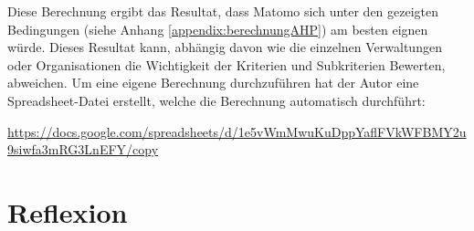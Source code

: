         Diese Berechnung ergibt das Resultat, dass Matomo sich unter den gezeigten Bedingungen (siehe Anhang \ref{appendix:berechnungAHP}) am besten eignen würde. Dieses Resultat kann, abhängig davon wie die einzelnen Verwaltungen oder Organisationen die Wichtigkeit der Kriterien und Subkriterien Bewerten, abweichen. Um eine eigene Berechnung durchzuführen hat der Autor eine Spreadsheet-Datei erstellt, welche die Berechnung automatisch durchführt:

        \url{https://docs.google.com/spreadsheets/d/1e5vWmMwuKuDppYaflFVkWFBMY2u9siwfa3mRG3LnEFY/copy}


        \newpage

\section{Reflexion}